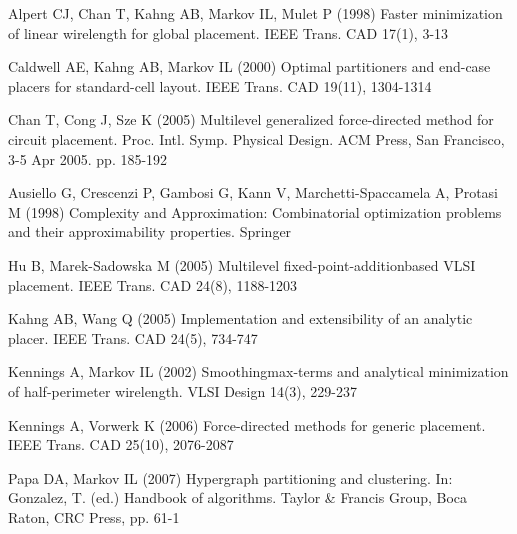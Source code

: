 \documentclass[natbib]{svcyclop}
\begin{document}
\begin{thebibliography}{12}
%

 {Alpert} CJ,
{Chan} T, {Kahng} AB, {Markov} IL, {Mulet} P (1998) Faster
minimization of linear wirelength for global placement. IEEE
Trans. CAD 17(1), 3-13

 {Caldwell} AE, {Kahng} AB, {Markov} IL (2000)
Optimal partitioners and end-case placers for standard-cell layout.
IEEE Trans. CAD 19(11), 1304-1314

{Chan} T, {Cong} J, {Sze} K (2005) Multilevel generalized force-directed
method for circuit placement. Proc. Intl. Symp. Physical Design.
ACM Press, San Francisco, 3-5 Apr 2005. pp. 185-192

 {Ausiello} G, {Crescenzi} P, {Gambosi} G,
{Kann} V, {Marchetti-Spaccamela} A, {Protasi} M (1998) Complexity and
Approximation: Combinatorial optimization problems and their
approximability properties. Springer

{Hu} B, {Marek-Sadowska} M (2005) Multilevel fixed-point-additionbased
VLSI placement. IEEE Trans. CAD 24(8), 1188-1203

{Kahng} AB, {Wang} Q (2005) Implementation and extensibility of an
analytic placer. IEEE Trans. CAD 24(5), 734-747

{Kennings} A, {Markov} IL (2002) Smoothingmax-terms and analytical
minimization of half-perimeter wirelength. VLSI Design 14(3),
229-237

{Kennings} A, {Vorwerk} K (2006) Force-directed methods for generic
placement. IEEE Trans. CAD 25(10), 2076-2087

{Papa} DA, {Markov} IL (2007) Hypergraph partitioning and clustering.
In: Gonzalez, T. (ed.) Handbook of algorithms. Taylor \&
Francis Group, Boca Raton, CRC Press, pp. 61-1


\end{thebibliography}
\end{document}
